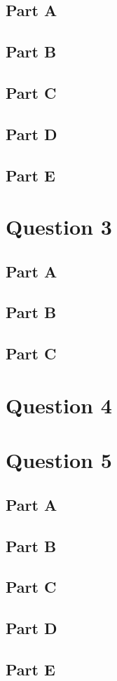 \documentclass[letterpaper]{article}
\begin{document}
\subsection*{Part A}

\subsection*{Part B}

\subsection*{Part C}

\subsection*{Part D}

\subsection*{Part E}

\section*{Question 3}

\subsection*{Part A}

\subsection*{Part B}

\subsection*{Part C}

\section*{Question 4}

\section*{Question 5}

\subsection*{Part A}

\subsection*{Part B}

\subsection*{Part C}

\subsection*{Part D}

\subsection*{Part E}
\end{document}
